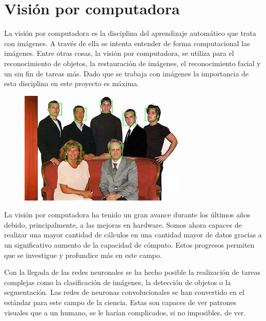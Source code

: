 \documentclass[12pt]{report} %
\begin{document}
	\section{Visión por computadora}
	La visión por computadora es la disciplina del aprendizaje automático que trata con imágenes. A través de ella se intenta entender de forma computacional
	las imágenes. Entre otras cosas, la visión por computadora, se utiliza para el reconocimiento de objetos, la restauración de imágenes, el reconocimiento facial
	y un sin fin de tareas más. Dado que se trabaja con imágenes la importancia de esta disciplina en este proyecto es máxima.
	\begin{figure}[H]
		{\includegraphics[scale=1]{cv-ejemplo.jpg}}
	\end{figure}
	La visión por computadora ha tenido un gran avance durante los últimos años debido, principalmente, a las mejoras en hardware. Somos ahora capaces de realizar
	una mayor cantidad de cálculos en una cantidad mayor de datos gracias a un significativo aumento de la capacidad de cómputo. Estos progresos permiten 
	que se investigue y profundice más en este campo.

	Con la llegada de las redes neuronales se ha hecho posible la realización de tareas complejas como la clasificación de imágenes,
	la detección de objetos o la segmentación. Las redes de neuronas convolucionales se han convertido en el estándar para este campo
	de la ciencia. Estas son capaces de ver patrones visuales que a un humano, se le harían complicados, si no imposibles, de ver.
\end{document}
